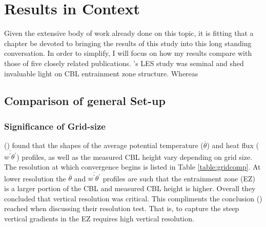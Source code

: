 
\chapter{Results in Context}
\label{ch:results}
\setlength{\parindent}{0cm}

Given the extensive body of work already done on this topic, it is fitting that a chapter be devoted to bringing the results of this study into this long standing conversation.  In order to simplify, I will focus on how my results compare with those of five closely related publications.  \citeauthor{SullMoengStev}'s \citeyear{SullMoengStev} \acs{LES} study was seminal and shed invaluable light on \acs{CBL} entrainment zone structure.  Whereas \citeauthor{BrooksFowler2} \citeyear{BrooksFowler2} 

\section{Comparison of general Set-up}
\FloatBarrier

\subsection{Significance of Grid-size}

\citeauthor{SullPat} (\citeyear{SullPat}) found that the shapes of the average potential temperature ($\overline{\theta}$) and heat flux ($\overline{w^{'}\theta^{'}}$) profiles, as well as the measured \acs{CBL} height vary depending on grid size.  The resolution at which convergence begins is listed in Table \ref{table:gridcomp}.  At lower resolution the $\overline{\theta}$ and $\overline{w^{'}\theta^{'}}$ profiles are such that the entrainment zone (\acs{EZ}) is a larger portion of the \acs{CBL} and measured \acs{CBL} height is higher.  Overall they concluded that vertical resolution was critical.  This compliments the conclusion \citeauthor{BrooksFowler2} (\citeyear{BrooksFowler2}) reached when discussing their resolution test.  That is, to capture the steep vertical gradients in the \acs{EZ} requires high vertical resolution. \\

